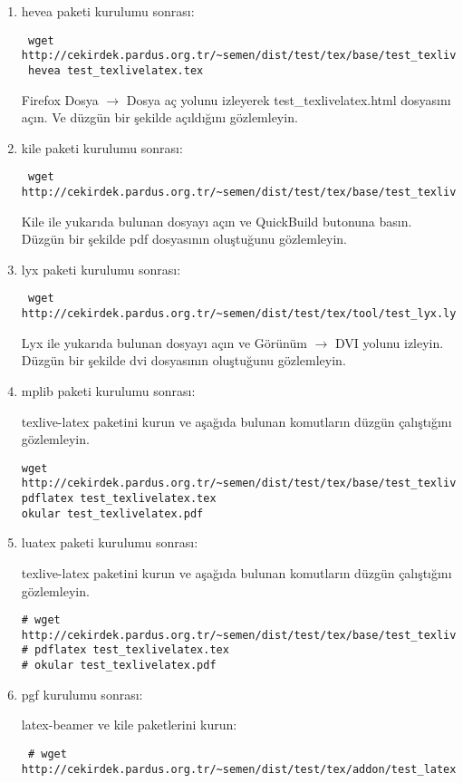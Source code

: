\documentclass[a4paper,10pt]{article}
\begin{document}
\begin{enumerate}
\item hevea paketi kurulumu sonrası:
 \begin{verbatim}
 wget http://cekirdek.pardus.org.tr/~semen/dist/test/tex/base/test_texlivelatex.tex
 hevea test_texlivelatex.tex
 \end{verbatim}
Firefox Dosya $\rightarrow$ Dosya aç yolunu izleyerek test\_texlivelatex.html dosyasını açın. Ve düzgün bir şekilde açıldığını gözlemleyin.

\item kile paketi kurulumu sonrası:
 \begin{verbatim}
 wget http://cekirdek.pardus.org.tr/~semen/dist/test/tex/base/test_texlivelatex.tex
 \end{verbatim}

Kile ile yukarıda bulunan dosyayı açın ve QuickBuild butonuna basın. Düzgün bir şekilde pdf dosyasının oluştuğunu gözlemleyin.
\item lyx paketi kurulumu sonrası:
 \begin{verbatim}
 wget http://cekirdek.pardus.org.tr/~semen/dist/test/tex/tool/test_lyx.lyx
 \end{verbatim}

Lyx ile yukarıda bulunan dosyayı açın ve Görünüm $\rightarrow$  DVI yolunu izleyin. Düzgün bir şekilde dvi dosyasının oluştuğunu gözlemleyin.

\item mplib paketi kurulumu sonrası:
  
 texlive-latex paketini kurun ve aşağıda bulunan komutların düzgün çalıştığını gözlemleyin.

\begin{verbatim}
wget http://cekirdek.pardus.org.tr/~semen/dist/test/tex/base/test_texlivelatex.tex
pdflatex test_texlivelatex.tex
okular test_texlivelatex.pdf
\end{verbatim}
\item luatex paketi kurulumu sonrası:
  
 texlive-latex paketini kurun ve aşağıda bulunan komutların düzgün çalıştığını gözlemleyin.

\begin{verbatim}
# wget http://cekirdek.pardus.org.tr/~semen/dist/test/tex/base/test_texlivelatex.tex
# pdflatex test_texlivelatex.tex
# okular test_texlivelatex.pdf
\end{verbatim}

\item  pgf kurulumu sonrası:

latex-beamer ve kile paketlerini kurun:
\begin{verbatim}
 # wget http://cekirdek.pardus.org.tr/~semen/dist/test/tex/addon/test_latexbeamer.tex
\end{verbatim}


\end{enumerate}
\end{document}

